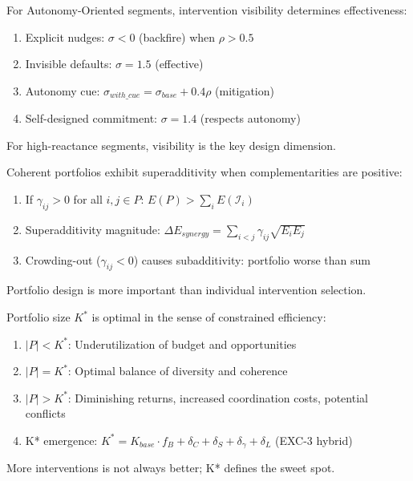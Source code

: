 \begin{theorem}
For Autonomy-Oriented segments, intervention visibility determines effectiveness:
\begin{enumerate}
\item Explicit nudges: $\sigma < 0$ (backfire) when $\rho > 0.5$
\item Invisible defaults: $\sigma = 1.5$ (effective)
\item Autonomy cue: $\sigma_{with\_cue} = \sigma_{base} + 0.4\rho$ (mitigation)
\item Self-designed commitment: $\sigma = 1.4$ (respects autonomy)
\end{enumerate}
For high-reactance segments, visibility is the key design dimension.
\end{theorem}

\begin{theorem}
Coherent portfolios exhibit superadditivity when complementarities are positive:
\begin{enumerate}
\item If $\gamma_{ij} > 0$ for all $i,j \in P$: $E(P) > \sum_i E(\mathcal{I}_i)$
\item Superadditivity magnitude: $\Delta E_{synergy} = \sum_{i<j} \gamma_{ij} \sqrt{E_i E_j}$
\item Crowding-out ($\gamma_{ij} < 0$) causes subadditivity: portfolio worse than sum
\end{enumerate}
Portfolio design is more important than individual intervention selection.
\end{theorem}

\begin{theorem}[MP-T44: K* Optimality]
Portfolio size $K^*$ is optimal in the sense of constrained efficiency:
\begin{enumerate}
\item $|P| < K^*$: Underutilization of budget and opportunities
\item $|P| = K^*$: Optimal balance of diversity and coherence
\item $|P| > K^*$: Diminishing returns, increased coordination costs, potential conflicts
\item K* emergence: $K^* = K_{base} \cdot f_B + \delta_C + \delta_S + \delta_\gamma + \delta_L$ (EXC-3 hybrid)
\end{enumerate}
More interventions is not always better; K* defines the sweet spot.
\end{theorem}

